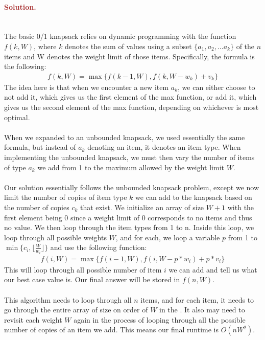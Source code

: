 \paragraph{\textcolor{brown}{Solution.}} \: \\
The basic 0/1 knapsack relies on dynamic programming with the function $f(k, W)$, where $k$ denotes the sum of values using a subset $\{a_1, a_2, ... a_k\}$ of the $n$ items and W denotes the weight limit of those items. Specifically, the formula is the following:
\begin{gather*}
    f(k, W) = \max\{f(k-1, W), f(k, W-w_k) + v_k\}
\end{gather*}
The idea here is that when we encounter a new item $a_k$, we can either choose to not add it, which gives us the first element of the max function, or add it, which gives us the second element of the max function, depending on whichever is most optimal.
\\ \\ When we expanded to an unbounded knapsack, we used essentially the same formula, but instead of $a_k$ denoting an item, it denotes an item type. When implementing the unbounded knapsack, we must then vary the number of items of type $a_k$ we add from 1 to the maximum allowed by the weight limit $W$.
\\ \\ Our solution essentially follows the unbounded knapsack problem, except we now limit the number of copies of item type $k$ we can add to the knapsack based on the number of copies $c_k$ that exist. We initialize an array of size $W+1$ with the first element being 0 since a weight limit of 0 corresponds to no items and thus no value. We then loop through the item types from 1 to n. Inside this loop, we loop through all possible weights $W$, and for each, we loop a variable $p$ from 1 to $\min \{c_i, \lfloor \frac{W}{w_i} \rfloor\}$ and use the following function:
\begin{gather*}
    f(i, W) = \max \{f(i-1, W), f(i, W-p*w_i) + p*v_i \}
\end{gather*}
This will loop through all possible number of item $i$ we can add and tell us what our best case value is. Our final answer will be stored in $f(n, W)$.
\\ \\ This algorithm needs to loop through all $n$ items, and for each item, it needs to go through the entire array of size on order of $W$ in the . It also may need to revisit each weight $W$ again in the process of looping through all the possible number of copies of an item we add. This means our final runtime is $O(nW^2)$.